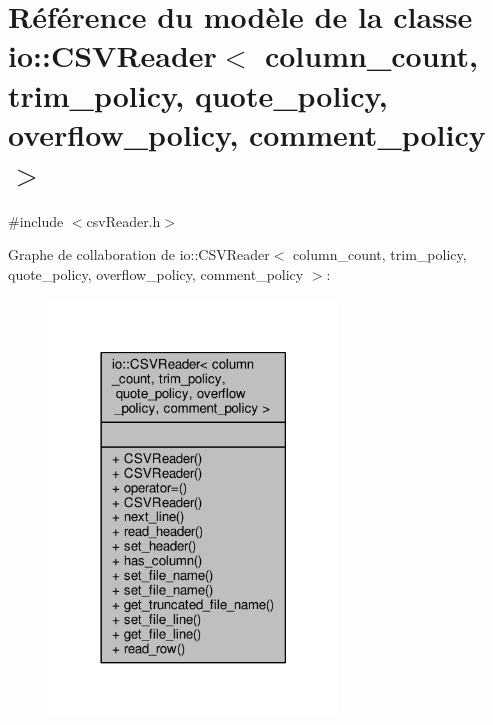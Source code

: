 \hypertarget{classio_1_1CSVReader}{}\section{Référence du modèle de la classe io\+:\+:C\+S\+V\+Reader$<$ column\+\_\+count, trim\+\_\+policy, quote\+\_\+policy, overflow\+\_\+policy, comment\+\_\+policy $>$}
\label{classio_1_1CSVReader}


{\ttfamily \#include $<$csv\+Reader.\+h$>$}



Graphe de collaboration de io\+:\+:C\+S\+V\+Reader$<$ column\+\_\+count, trim\+\_\+policy, quote\+\_\+policy, overflow\+\_\+policy, comment\+\_\+policy $>$\+:
\nopagebreak
\begin{figure}[H]
\begin{center}
\leavevmode
\includegraphics[width=218pt]{classio_1_1CSVReader__coll__graph}
\end{center}
\end{figure}
